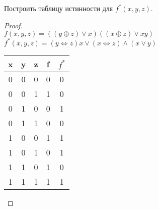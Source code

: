 \begin{problem}
Построить таблицу истинности для  $f^*(x, y, z)$.
\end{problem}
\begin{proof} $ $\\
    $f(x, y, z) = ((y \oplus z) \vee x)((x \oplus z) \vee xy)$\\
    $f^*(x, y, z) = (y \Leftrightarrow z)x \vee (x \Leftrightarrow z) \wedge (x \vee y)$\\
    \begin{table}[H]
    \begin{center}
    \begin{tabular}{|c|c|c|c|c|}
    \hline
    x & y & z & f & $f^*$\\
    \hline
    0 & 0 & 0   & 0 & 0\\
    0 & 0 & 1   & 1 & 0\\
    0 & 1 & 0   & 0 & 1\\
    0 & 1 & 1   & 0 & 0\\
    1 & 0 & 0   & 1 & 1\\
    1 & 0 & 1   & 0 & 1\\
    1 & 1 & 0   & 1 & 0\\
    1 & 1 & 1   & 1 & 1\\
    \hline
    \end{tabular}
    \end{center}
    \end{table}
\end{proof}

